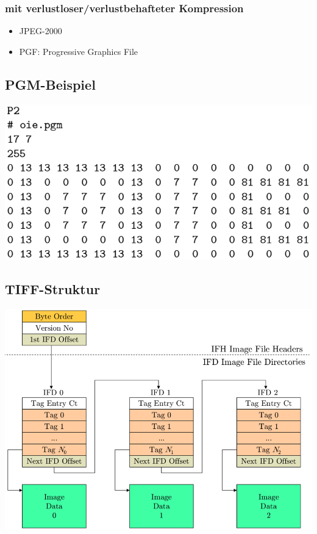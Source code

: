 \documentclass[10pt]{article}
\begin{document}
\subsubsection*{mit verlustloser/verlustbehafteter Kompression}
\begin{itemize}
	\item JPEG-2000
	\item PGF: Progressive Graphics File
\end{itemize}

\subsection{PGM-Beispiel}
\begin{center}
	\includegraphics[scale=0.2]{pgm.png}
\end{center}

\subsection{TIFF-Struktur}
\begin{center}
	\includegraphics[scale=0.2]{tiff.png}
\end{center}
\end{document}
